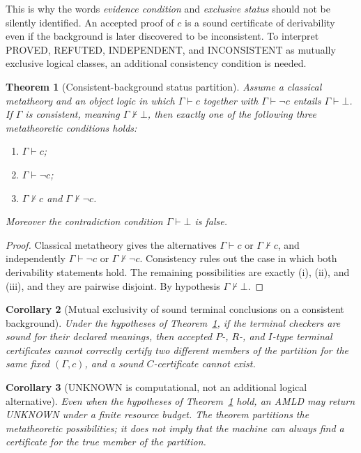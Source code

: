 \documentclass[11pt,openany]{book}
\newtheorem{theorem}{Theorem}[chapter]
\newtheorem{corollary}[theorem]{Corollary}
\theoremstyle{definition}
\theoremstyle{remark}
\newcommand{\botc}{\bot}
\begin{document}
This is why the words \emph{evidence condition} and \emph{exclusive status} should not be silently identified. An accepted proof of $c$ is a sound certificate of derivability even if the background is later discovered to be inconsistent. To interpret \textsf{PROVED}, \textsf{REFUTED}, \textsf{INDEPENDENT}, and \textsf{INCONSISTENT} as mutually exclusive logical classes, an additional consistency condition is needed.

\begin{theorem}[Consistent-background status partition]\label{thm:statuspartition}
Assume a classical metatheory and an object logic in which $\Gamma\vdash c$ together with $\Gamma\vdash\neg c$ entails $\Gamma\vdash\botc$. If $\Gamma$ is consistent, meaning $\Gamma\nvdash\botc$, then exactly one of the following three metatheoretic conditions holds:
\begin{enumerate}[label=(\roman*)]
\item $\Gamma\vdash c$;
\item $\Gamma\vdash\neg c$;
\item $\Gamma\nvdash c$ and $\Gamma\nvdash\neg c$.
\end{enumerate}
Moreover the contradiction condition $\Gamma\vdash\botc$ is false.
\end{theorem}
\begin{proof}
Classical metatheory gives the alternatives $\Gamma\vdash c$ or $\Gamma\nvdash c$, and independently $\Gamma\vdash\neg c$ or $\Gamma\nvdash\neg c$. Consistency rules out the case in which both derivability statements hold. The remaining possibilities are exactly (i), (ii), and (iii), and they are pairwise disjoint. By hypothesis $\Gamma\nvdash\botc$.
\end{proof}

\begin{corollary}[Mutual exclusivity of sound terminal conclusions on a consistent background]\label{cor:terminalexclusive}
Under the hypotheses of Theorem~\ref{thm:statuspartition}, if the terminal checkers are sound for their declared meanings, then accepted $P$-, $R$-, and $I$-type terminal certificates cannot correctly certify two different members of the partition for the same fixed $(\Gamma,c)$, and a sound $C$-certificate cannot exist.
\end{corollary}

\begin{corollary}[UNKNOWN is computational, not an additional logical alternative]\label{cor:unknowncomputational}
Even when the hypotheses of Theorem~\ref{thm:statuspartition} hold, an AMLD may return \textsf{UNKNOWN} under a finite resource budget. The theorem partitions the metatheoretic possibilities; it does not imply that the machine can always find a certificate for the true member of the partition.
\end{corollary}
\end{document}
